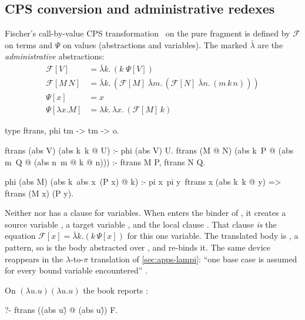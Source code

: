 {{\subsection{CPS conversion and administrative redexes}\label{sec:apps-cps}

Fischer's call-by-value CPS transformation~\cite{Fischer1972}  on the pure fragment is
defined by $\mathcal{F}$ on terms and $\Psi$ on values (abstractions and variables). The marked
$\bar\lambda$ are the \emph{administrative} abstractions:
\begin{align*}
  \mathcal{F}[V] &= \bar\lambda k.\,(k\;\Psi[V])\\
  \mathcal{F}[M\,N] &= \bar\lambda k.\,(\mathcal{F}[M]\;\bar\lambda m.\,(\mathcal{F}[N]\;\bar\lambda n.\,(m\,k\,n)))\\
  \Psi[x] &= x\\
  \Psi[\lambda x.M] &= \lambda k.\,\lambda x.\,(\mathcal{F}[M]\,k)
\end{align*}

\begin{lprolog}
type ftrans, phi  tm -> tm -> o.

ftrans (abs V) (abs k\ k @ U) :- phi (abs V) U.
ftrans (M @ N) (abs k\ P @ (abs m\ Q @ (abs n\ m @ k @ n))) :-
    ftrans M P, ftrans N Q.

phi (abs M) (abs k\ abs x\ (P x) @ k) :-
    pi x\ pi y\ ftrans x (abs k\ k @ y) => ftrans (M x) (P y).
\end{lprolog}

\begin{tutorial}
Neither  nor  has a clause for variables. When  enters the binder of
, it creates a source variable , a target variable , and the local clause
. That clause \emph{is} the equation $\mathcal{F}[x]=\bar\lambda k.(k\,\Psi[x])$
for this one variable. The translated body is , a pattern, so  is the body abstracted over
, and  re-binds it. The same device reappears in the $\lambda$-to-$\pi$
translation of \cref{sec:apps-lampi}: ``one base case is assumed for every bound variable encountered''
.
\end{tutorial}

\noindent On $(\lambda u.u)(\lambda u.u)$ the book reports :
\begin{lprolog}
?- ftrans ((abs u\u) @ (abs u\u)) F.


\end{lprolog}}}
